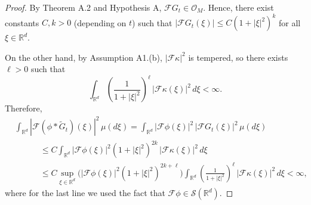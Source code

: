 \documentclass[10pt,a4paper]{amsart}
\def\bR{\mathbb{R}}
\def\cF{\mathcal{F}}
\def\cS{\mathcal{S}}
\def\k{\kappa}
\begin{document}
\begin{proof} By Theorem A.2 and Hypothesis A, $\cF G_t \in \mathcal O_M$. Hence, there exist constants $C,k>0$ (depending on $t$) such that $|\cF G_t(\xi)| \le C(1+|\xi|^2)^k$ for all $\xi\in \bR^d$.

On the other hand, by Assumption A1.(b), $|\cF \k|^2$ is tempered, so there exists $\ell>0$ such that
\[
\int_{\bR^d} \left(\frac{1}{1+|\xi|^2}\right)^{\ell}\,|\cF \k(\xi)|^2\,d\xi < \infty.
\]
Therefore,
\begin{equation*}
\begin{aligned}
& \int_{\bR^d} |\cF(\phi*\widetilde{G}_{t})(\xi)|^2\,\mu(d\xi)
 = \int_{\bR^d} |\cF\phi(\xi)|^2\,|\cF G_{t}(\xi)|^2\,\mu(d\xi) \\
& \quad \quad \quad \le C \int_{\bR^d} |\cF\phi(\xi)|^2 (1+|\xi|^2)^{2k}\,|\cF \k(\xi)|^2\,d\xi \\
& \quad \quad \quad \le C \sup_{\xi\in\bR^d}\Big(|\cF\phi(\xi)|^2 (1+|\xi|^2)^{2k+\ell}\Big)
\int_{\bR^d} \left(\frac{1}{1+|\xi|^2}\right)^{\ell}\,|\cF \k(\xi)|^2\,d\xi < \infty,
\end{aligned}
\end{equation*}
where for the last line we used the fact that $\cF\phi\in \cS(\bR^d)$.
\end{proof}
\end{document}
